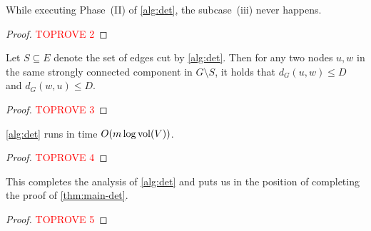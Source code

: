 \begin{lemma} \label{lem:ldd-det-well-defined}
While executing Phase~(II) of \cref{alg:det}, the subcase~(iii) never happens.
\end{lemma}
\begin{proof}\textcolor{red}{TOPROVE 2}\end{proof}

\begin{lemma} \label{lem:ldd-det-correctness}
Let $S \subseteq E$ denote the set of edges cut by \cref{alg:det}. Then for any two nodes $u, w$ in the same strongly connected component in $G \setminus S$, it holds that $d_G(u, w) \leq D$ and $d_G(w, u) \leq D$.
\end{lemma}
\begin{proof}\textcolor{red}{TOPROVE 3}\end{proof}

\begin{lemma} \label{lem:ldd-det-time}
\cref{alg:det} runs in time $O(m \log \operatorname{vol}(V))$.
\end{lemma}
\begin{proof}\textcolor{red}{TOPROVE 4}\end{proof}

This completes the analysis of \cref{alg:det} and puts us in the position of completing the proof of \cref{thm:main-det}.

\begin{proof}\textcolor{red}{TOPROVE 5}\end{proof}